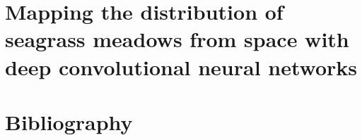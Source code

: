 \documentclass[
	10pt, %
	fleqn, %
	a4paper, %
]{LegrandOrangeBook}
\begin{document}
\chapter{Mapping the distribution of seagrass meadows from space with deep
  convolutional neural networks}
%

\stopcontents[part] %


\chapterimage{} %
\chapterspaceabove{2.5cm} %
\chapterspacebelow{2cm} %


\chapter*{Bibliography}
\printbibliography





\end{document}
